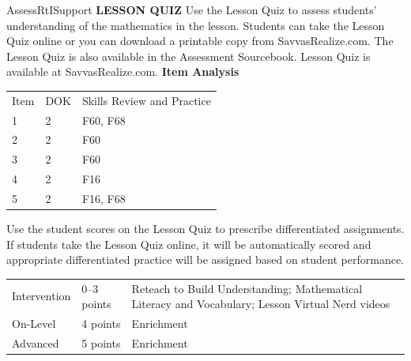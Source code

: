 \documentclass{article}
\newenvironment{te-addendum}[2]{}{}     %
\begin{document}
\begin{te-addendum}{Assess}{RtISupport}
\textbf{LESSON QUIZ}
Use the Lesson Quiz to assess students' understanding of the mathematics in the lesson.
Students can take the Lesson Quiz online or you can download a printable copy from SavvasRealize.com. The Lesson Quiz is also available in the Assessment Sourcebook.
Lesson Quiz is available at SavvasRealize.com.
\textbf{Item Analysis}
\begin{tabular}{lll}
Item & DOK & Skills Review and Practice \\
1 & 2 & F60, F68 \\
2 & 2 & F60 \\
3 & 2 & F60 \\
4 & 2 & F16 \\
5 & 2 & F16, F68 \\
\end{tabular}
Use the student scores on the Lesson Quiz to prescribe differentiated assignments.
If students take the Lesson Quiz online, it will be automatically scored and appropriate differentiated practice will be assigned based on student performance.
\begin{tabular}{lll}
Intervention & 0--3 points & Reteach to Build Understanding; Mathematical Literacy and Vocabulary; Lesson Virtual Nerd videos \\
On-Level & 4 points & Enrichment \\
Advanced & 5 points & Enrichment \\
\end{tabular}
\end{te-addendum}
\end{document}

